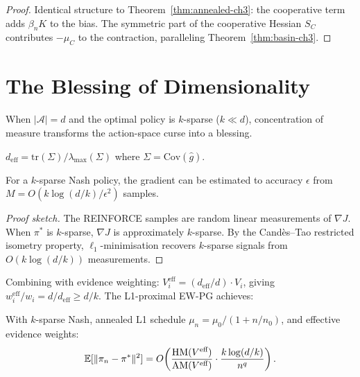 \begin{proof}
Identical structure to Theorem~\ref{thm:annealed-ch3}: the cooperative term adds $\beta_n K$ to the bias. The symmetric part of the cooperative Hessian $S_C$ contributes $-\mu_C$ to the contraction, paralleling Theorem~\ref{thm:basin-ch3}.
\end{proof}


\section{The Blessing of Dimensionality}
\label{sec:blessing}

When $|\mathcal{A}| = d$ and the optimal policy is $k$-sparse ($k \ll d$), concentration of measure transforms the action-space curse into a blessing.

\begin{definition}
\label{def:deff-ch3}
$d_{\text{eff}} = \text{tr}(\Sigma)/\lambda_{\max}(\Sigma)$ where $\Sigma = \text{Cov}(\hat{g})$.
\end{definition}

\begin{theorem}
\label{thm:sparse-recovery}
For a $k$-sparse Nash policy, the gradient can be estimated to accuracy $\epsilon$ from $M = O(k \log(d/k) / \epsilon^2)$ samples.
\end{theorem}

\begin{proof}[Proof sketch]
The REINFORCE samples are random linear measurements of $\nabla J$. When $\pi^*$ is $k$-sparse, $\nabla J$ is approximately $k$-sparse. By the Cand\`es--Tao restricted isometry property, $\ell_1$-minimisation recovers $k$-sparse signals from $O(k \log(d/k))$ measurements.
\end{proof}

Combining with evidence weighting: $V_i^{\text{eff}} = (d_{\text{eff}}/d) \cdot V_i$, giving $w_i^{\text{eff}}/w_i = d/d_{\text{eff}} \geq d/k$. The L1-proximal EW-PG achieves:

\begin{theorem}
\label{thm:sparse-ewpg-ch3}
With $k$-sparse Nash, annealed L1 schedule $\mu_n = \mu_0/(1+n/n_0)$, and effective evidence weights:
\begin{equation}
    \mathbb{E}[\|\pi_n - \pi^*\|^2] = O\!\left(\frac{\text{HM}(V^{\text{eff}})}{\text{AM}(V^{\text{eff}})} \cdot \frac{k \log(d/k)}{n^q}\right).
\end{equation}
\end{theorem}


